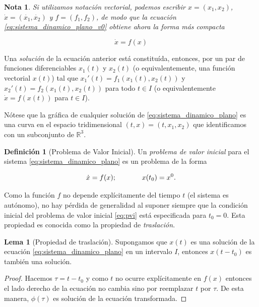 \documentclass[11pt]{book}
\theoremstyle{definition}
\newtheorem{definition}{Definición}
\numberwithin{definition}{section}
\theoremstyle{theorem}
\newtheorem{lemma}{Lema}
\numberwithin{theorem}{section}
\numberwithin{lemma}{section}
\numberwithin{corollary}{section}
\theoremstyle{plain}
\numberwithin{example}{section}
\newtheorem{remark}{Nota}
\newcommand{\R}{{\ensuremath{\mathbb{R}}}}
\begin{document}
\begin{remark}
Si utilizamos notación vectorial, podemos escribir $x = (x_1, x_2)$, $\dot{x} = (\dot{x_1}, \dot{x_2})$ y $f = (f_1, f_2)$, de modo que la ecuación \ref{eq:sistema_dinamico_plano_v0} obtiene ahora la forma más compacta

\begin{equation} \label{eq:sistema_dinamico_plano}
    \dot{x} = f(x)
\end{equation}
\end{remark}

Una \emph{solución} de la ecuación anterior está constituída, entonces, por un par de funciones diferenciables $x_1(t)$ y $x_2(t)$ (o equivalentemente, una función vectorial $x(t)$) tal que $x_1'(t) = f_1(x_1(t), x_2(t))$ y $x_2'(t) = f_2(x_1(t), x_2(t))$ para todo $t \in I$ (o equivalentemente $\dot{x} = f(x(t))$ para $t \in I$).

Nótese que la gráfica de cualquier solución de \ref{eq:sistema_dinamico_plano} es una curva en el espacio tridimensional $(t,x)=(t,x_1,x_2)$ que identificamos con un subconjunto de $\R^3$.

\begin{definition}[Problema de Valor Inicial]\label{def:pvi}
Un \emph{problema de valor inicial} para el sistema \ref{eq:sistema_dinamico_plano} es un problema de la forma

\begin{equation} \label{eq:pvi}
 \dot{x} = f(x); \hspace{0.5in} x(t_0) = x^0.
\end{equation}

\end{definition}

Como la función $f$ no depende explícitamente del tiempo $t$ (el sistema es autónomo), no hay pérdida de generalidad al suponer siempre que la condición inicial del problema de valor inicial \ref{eq:pvi} está especificada para $t_0 = 0$. Esta propiedad es conocida como la propiedad de \emph{traslación}.

\begin{lemma}[Propiedad de traslación] Supongamos que $x(t)$ es una solución de la ecuación \ref{eq:sistema_dinamico_plano} en un intervalo $I$, entonces $x(t-t_0)$ es también una solución.
\begin{proof}Hacemos $\tau = t - t_0$ y como $t$ no ocurre explícitamente en $f(x)$ entonces el lado derecho de la ecuación no cambia sino por reemplazar $t$ por $\tau$. De esta manera, $\phi(\tau)$ es solución de la ecuación transformada.
\end{proof}
\end{lemma}
\end{document}
